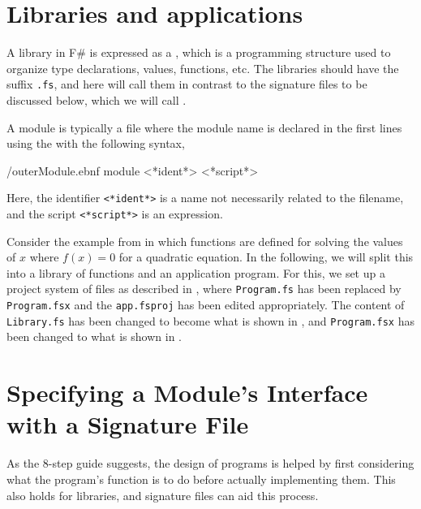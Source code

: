 \documentclass[fsharpNotes.tex]{subfiles}
\begin{document}
\section{Libraries and applications}
\label{sec:modules}
A library in F\# is expressed as a , which is a programming structure used to organize type declarations, values, functions, etc. The libraries should have the suffix \lstinline[language=console]{.fs}, and here will call them  in contrast to the signature files to be discussed below, which we will call .

A module is typically a file where the module name is declared in the first lines using the  with the following syntax,
%
\begin{verbatimwrite}{\ebnf/outerModule.ebnf}
module <*ident*>
<*script*>
\end{verbatimwrite}
%
Here, the identifier \lstinline[language=syntax]{<*ident*>} is a name not necessarily related to the filename, and the script \lstinline[language=syntax]{<*script*>} is an expression.

Consider the example from  in which functions are defined for solving the values of $x$ where $f(x)=0$ for a quadratic equation. In the following, we will split this into a library of functions and an application program. For this, we set up a project system of files as described in , where \lstinline[language=console]{Program.fs} has been replaced by \lstinline[language=console]{Program.fsx} and the \lstinline[language=console]{app.fsproj} has been edited appropriately. The content of  \lstinline[language=console]{Library.fs} has been changed to become what is shown in , 
and \lstinline[language=console]{Program.fsx} has been changed to what is shown in .

\section{Specifying a Module's Interface with a Signature File}
As the 8-step guide suggests, the design of programs is helped by first considering what the program's function is to do before actually implementing them. This also holds for libraries, and signature files can aid this process. 
\end{document}
